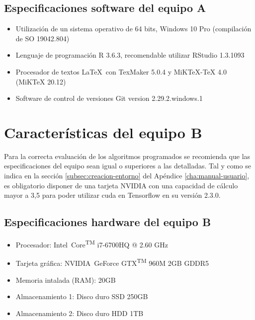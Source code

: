 \subsection{Especificaciones software del equipo A}
\label{subsec:especificaciones-software-equipoa}
\begin{itemize}
    \item Utilización de un sistema operativo de 64 bits, Windows 10 Pro (compilación de SO 19042.804)
    \item Lenguaje de programación R 3.6.3, recomendable utilizar RStudio 1.3.1093
    \item Procesador de textos \LaTeX\ con TexMaker 5.0.4 y MiKTeX-TeX 4.0 (MiKTeX 20.12)
    \item Software de control de versiones Git version 2.29.2.windows.1
\end{itemize}

\section{Características del equipo B}
\label{sec:caracteristicas-segun-equipob}

Para la correcta evaluación de los algoritmos programados se recomienda que las especificaciones del equipo sean igual o superiores a las detalladas. Tal y como se indica en la sección \ref{subsec:creacion-entorno} del Apéndice \ref{cha:manual-usuario}, es obligatorio disponer de una tarjeta NVIDIA con una capacidad de cálculo mayor a 3,5 para poder utilizar \gls{cuda} en Tensorflow en su versión 2.3.0.

\subsection{Especificaciones hardware del equipo B}
\label{subsec:especificaciones-hardware-equipob}

\begin{itemize}
    \item Procesador: Intel\textregistered\ Core\textsuperscript{TM} i7-6700HQ @ 2.60 GHz
    \item Tarjeta gráfica: NVIDIA\textregistered\ GeForce GTX\textsuperscript{TM} 960M 2GB GDDR5
    \item Memoria intalada (RAM): 20GB
    \item Almacenamiento 1: Disco duro SSD 250GB
    \item Almacenamiento 2: Disco duro HDD 1TB
\end{itemize}

